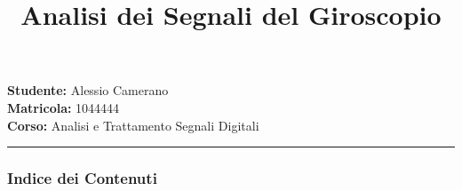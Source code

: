 \documentclass[11pt]{article}
\title{Analisi dei Segnali del Giroscopio}
\date{}
\author{}
\begin{document}
    
    \maketitle
    
    

    
    \textbf{Studente:} Alessio Camerano\\
\textbf{Matricola:} 1044444\\
\textbf{Corso:} Analisi e Trattamento Segnali Digitali

\begin{center}\rule{0.5\linewidth}{0.5pt}\end{center}

\subsubsection{Indice dei Contenuti}\label{indice-dei-contenuti}
\end{document}
